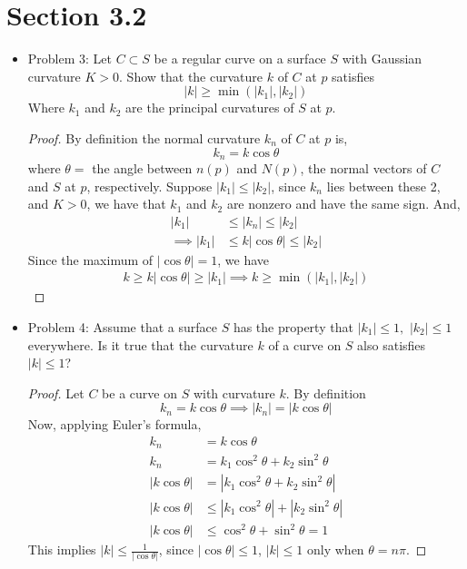 \documentclass[a4paper,17pt]{extarticle}
\title{\scalebox{1.5}{Math 553 Homework 7}}
\author{\scalebox{1.5}{Theo Koss}}
\date{May 2022}
\theoremstyle{definition}
\begin{document}
\maketitle
\section{Section 3.2}
\begin{itemize}
    \item Problem 3: Let $C\subset S$ be a regular curve on a surface $S$ with Gaussian curvature $K>0$. Show that the curvature $k$ of $C$ at $p$ satisfies $$|k|\geq\min(|k_1|,|k_2|)$$ Where $k_1$ and $k_2$ are the principal curvatures of $S$ at $p$.\begin{proof}By definition the normal curvature $k_n$ of $C$ at $p$ is, $$k_n=k\cos\theta$$ where $\theta=$ the angle between $n(p)$ and $N(p)$, the normal vectors of $C$ and $S$ at $p$, respectively. Suppose $|k_1|\leq|k_2|$, since $k_n$ lies between these 2, and $K>0$, we have that $k_1$ and $k_2$ are nonzero and have the same sign. And, \begin{align*}
           |k_1|&\leq|k_n|\leq|k_2|\\
           \implies|k_1|&\leq k|\cos\theta|\leq|k_2|
    \end{align*}
Since the maximum of $|\cos\theta|=1$, we have \begin{align*}
    k\geq k|\cos\theta|\geq|k_1|\implies k\geq\min(|k_1|,|k_2|)
\end{align*} 
    \end{proof}
    \item Problem 4: Assume that a surface $S$ has the property that $|k_1|\leq1,$ $|k_2|\leq1$ everywhere. Is it true that the curvature $k$ of a curve on $S$ also satisfies $|k|\leq1$?\begin{proof} Let $C$ be a curve on $S$ with curvature $k$. By definition $$k_n=k\cos\theta\implies|k_n|=|k\cos\theta|$$ Now, applying Euler's formula, \begin{align*}
        k_n&=k\cos\theta\\
        k_n&=k_1\cos^2\theta+k_2\sin^2\theta\\
        |k\cos\theta|&=|k_1\cos^2\theta+k_2\sin^2\theta|\\
        |k\cos\theta|&\leq|k_1\cos^2\theta|+|k_2\sin^2\theta|\\
        |k\cos\theta|&\leq\cos^2\theta+\sin^2\theta=1
    \end{align*}
    This implies $|k|\leq\frac{1}{|\cos\theta|}$, since $|\cos\theta|\leq1$, $|k|\leq1$ only when $\theta=n\pi$.

\end{proof}
\end{itemize}
\end{document}
